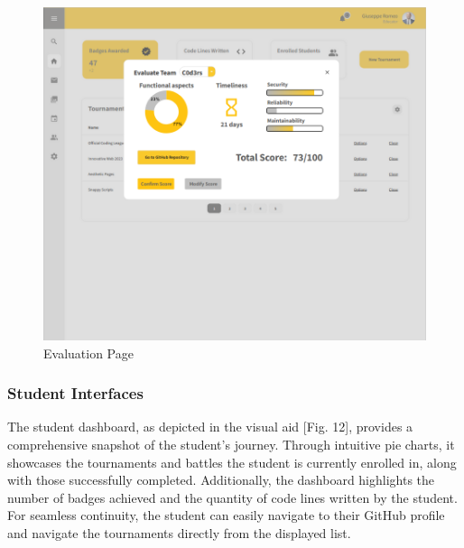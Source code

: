 \documentclass[12pt,oneside,a4paper]{article}
\begin{document}
\begin{figure}[htbp]
    \centering
    \includegraphics[width=1\linewidth]{Images/Interfaces/Educator Interfaces/EvaluationPage.png}
    \caption{Evaluation Page}
    \label{fig:enter-label}
\end{figure}

\pagebreak

\subsubsection{Student Interfaces}
\begin{flushleft}
The student dashboard, as depicted in the visual aid [Fig. 12], provides a comprehensive snapshot of the student's journey. Through intuitive pie charts, it showcases the tournaments and battles the student is currently enrolled in, along with those successfully completed. Additionally, the dashboard highlights the number of badges achieved and the quantity of code lines written by the student. For seamless continuity, the student can easily navigate to their GitHub profile and navigate the tournaments directly from the displayed list.    
\end{flushleft}
\end{document}
